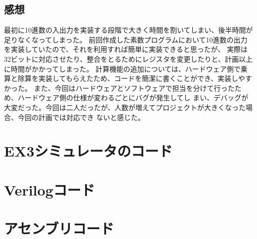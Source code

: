 \documentclass{jsarticle}
\begin{document}
\subsection*{感想}
最初に10進数の入出力を実装する段階で大きく時間を割いてしまい、後半時間が足りなくなってしまった。
前回作成した素数プログラムにおいて10進数の出力を実装していたので、それを利用すれば簡単に実装できると思ったが、
実際は32ビットに対応させたり、整合をとるためにレジスタを変更したりと、計画以上に時間がかかってしまった。
計算機能の追加については、ハードウェア側で乗算と除算を実装してもらえたため、コードを簡潔に書くことができ、実装しやすかった。
また、今回はハードウェアとソフトウェアで担当を分けて行ったため、ハードウェア側の仕様が変わるごとにバグが発生してし
まい、デバッグが大変だった。今回は二人だったが、人数が増えてプロジェクトが大きくなった場合、今回の計画では対応でき
ないと感じた。





\section*{EX3シミュレータのコード}





\section*{Verilogコード}





\section*{アセンブリコード}

\end{document}
